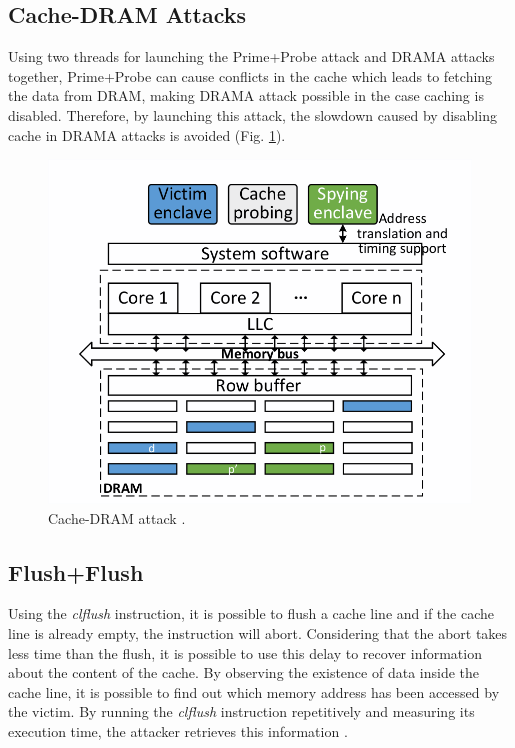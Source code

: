 \subsection{Cache-DRAM Attacks}
Using two threads for launching the Prime+Probe attack \cite{primeprobe1, primeprobe2} and DRAMA attacks \cite{drama} together, Prime+Probe can cause conflicts in the cache which leads to fetching the data from DRAM, making DRAMA attack possible in the case caching is disabled. Therefore, by launching this attack, the slowdown caused by disabling cache in DRAMA attacks is avoided \cite{leakycauldron} (Fig. \ref{fig:cachedram}).

\begin{figure}
	\includegraphics[scale=0.3]{images/cachedram}
	\caption{Cache-DRAM attack \cite{kayaalp2016high}.}
	\label{fig:cachedram}
\end{figure}

\subsection{Flush+Flush}
Using the \emph{clflush} instruction, it is possible to flush a cache line and if the cache line is already empty, the instruction will abort. Considering that the abort takes less time than the flush, it is possible to use this delay to recover information about the content of the cache. By observing the existence of data inside the cache line, it is possible to find out which memory address has been accessed by the victim. By running the \emph{clflush} instruction repetitively and measuring its execution time, the attacker retrieves this information \cite{flushflush}.

